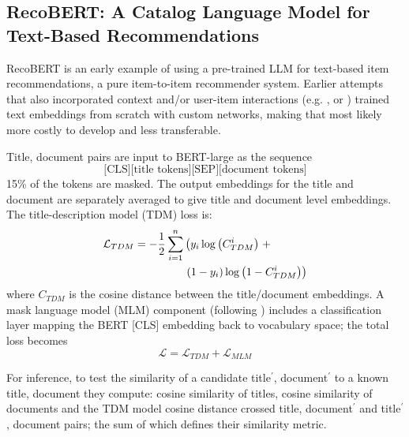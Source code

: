 \documentclass[11pt]{article}
\begin{document}

\subsection{RecoBERT: A Catalog Language Model for Text-Based Recommendations \cite{Malkiel2020}}

RecoBERT is an early example of using a pre-trained LLM for text-based item recommendations, a pure item-to-item recommender system. Earlier attempts that also incorporated context and/or user-item interactions (e.g. \cite{Djuric2015}, \cite{Zheng2017} or \cite{deSouza2018}) trained text embeddings from scratch with custom networks, making that most likely more costly to develop and less transferable. 

Title, document pairs are input to BERT-large as the sequence
\begin{equation*}
  \text{[CLS][title tokens][SEP][document tokens]}
\end{equation*}
15\% of the tokens are masked. The output embeddings for the title and document are separately averaged to give title and document level embeddings. The title-description model (TDM) loss is:
\begin{align}
  \begin{split}
  \mathcal{L}_{TDM} = -{1 \over 2}\sum_{i=1}^n & \left(  y_i \log \left(C_{TDM}^i \right) \right. + \\
              &  \left. (1-y_i)\log \left( 1- C_{TDM}^i \right) \right)
  \end{split}
\end{align} 
where $C_{TDM}$ is the cosine distance between the title/document embeddings.
A mask language model (MLM) component (following \cite{Devlin2019}) includes a classification layer mapping the BERT [CLS] embedding back to vocabulary space; the total loss becomes
\begin{equation}
  \mathcal{L} = \mathcal{L}_{TDM} + \mathcal{L}_{MLM}
\end{equation}

For inference, to test the similarity of a candidate title$^\prime$, document$^\prime$ to a known title, document they compute: cosine similarity of titles, cosine similarity of documents and the TDM model cosine distance crossed title, document$^\prime$ and title$^\prime$, document pairs; the sum of which defines their similarity metric.
\end{document}
